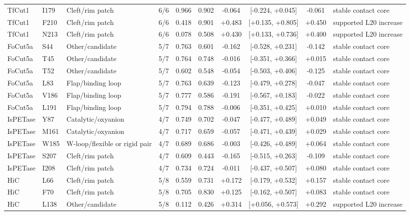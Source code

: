 \begin{landscape}
\begin{longtable}{@{}lllcS[table-format=1.3]S[table-format=1.3]S[table-format=+1.3,retain-explicit-plus=true]cS[table-format=+1.3,retain-explicit-plus=true]l@{}}
TfCut1 & I179 & Cleft/rim patch & 6/6 & 0.966 & 0.902 & -0.064 & [-0.224, +0.045] & -0.061 & stable contact core \\
TfCut1 & F210 & Cleft/rim patch & 6/6 & 0.418 & 0.901 & +0.483 & [+0.135, +0.805] & +0.450 & supported L20 increase \\
TfCut1 & N213 & Cleft/rim patch & 6/6 & 0.078 & 0.508 & +0.430 & [+0.133, +0.736] & +0.400 & supported L20 increase \\
FoCut5a & S44 & Other/candidate & 5/7 & 0.763 & 0.601 & -0.162 & [-0.528, +0.231] & -0.142 & stable contact core \\
FoCut5a & T45 & Other/candidate & 5/7 & 0.764 & 0.748 & -0.016 & [-0.351, +0.366] & +0.015 & stable contact core \\
FoCut5a & T52 & Other/candidate & 5/7 & 0.602 & 0.548 & -0.054 & [-0.503, +0.406] & -0.125 & stable contact core \\
FoCut5a & L83 & Flap/binding loop & 5/7 & 0.763 & 0.639 & -0.123 & [-0.479, +0.278] & -0.047 & stable contact core \\
FoCut5a & V186 & Flap/binding loop & 5/7 & 0.777 & 0.586 & -0.191 & [-0.567, +0.183] & -0.022 & stable contact core \\
FoCut5a & L191 & Flap/binding loop & 5/7 & 0.794 & 0.788 & -0.006 & [-0.351, +0.425] & +0.010 & stable contact core \\
IsPETase & Y87 & Catalytic/oxyanion & 4/7 & 0.749 & 0.702 & -0.047 & [-0.477, +0.489] & +0.049 & stable contact core \\
IsPETase & M161 & Catalytic/oxyanion & 4/7 & 0.717 & 0.659 & -0.057 & [-0.471, +0.439] & +0.029 & stable contact core \\
IsPETase & W185 & W-loop/flexible or rigid pair & 4/7 & 0.689 & 0.686 & -0.003 & [-0.426, +0.489] & +0.064 & stable contact core \\
IsPETase & S207 & Cleft/rim patch & 4/7 & 0.609 & 0.443 & -0.165 & [-0.515, +0.263] & -0.109 & stable contact core \\
IsPETase & I208 & Cleft/rim patch & 4/7 & 0.734 & 0.724 & -0.011 & [-0.437, +0.507] & +0.080 & stable contact core \\
HiC & L66 & Cleft/rim patch & 5/8 & 0.559 & 0.731 & +0.172 & [-0.179, +0.532] & +0.157 & stable contact core \\
HiC & F70 & Cleft/rim patch & 5/8 & 0.705 & 0.830 & +0.125 & [-0.162, +0.507] & +0.083 & stable contact core \\
HiC & L138 & Other/candidate & 5/8 & 0.112 & 0.426 & +0.314 & [+0.056, +0.573] & +0.292 & supported L20 increase \\

\end{longtable}
\end{landscape}
